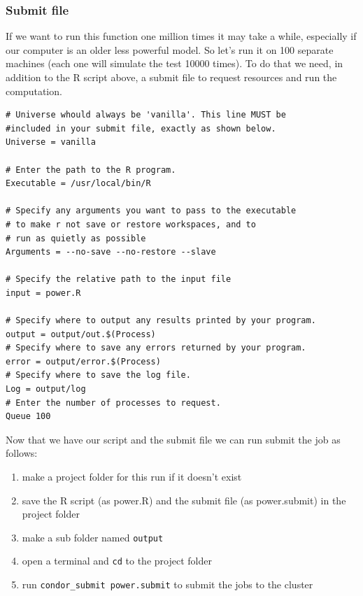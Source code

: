 \documentclass[11pt]{article}
\begin{document}
\subsubsection{Submit file}
\label{sec-7-3-2}
If we want to run this function one million times it may take a while, especially if our computer is an older less powerful model. So let's run it on 100 separate machines (each one will simulate the test 10000 times). To do that we need, in addition to the R script above, a submit file to request resources and run the computation. 
\begin{verbatim}
# Universe whould always be 'vanilla'. This line MUST be 
#included in your submit file, exactly as shown below.
Universe = vanilla

# Enter the path to the R program.
Executable = /usr/local/bin/R

# Specify any arguments you want to pass to the executable
# to make r not save or restore workspaces, and to 
# run as quietly as possible
Arguments = --no-save --no-restore --slave

# Specify the relative path to the input file
input = power.R

# Specify where to output any results printed by your program.
output = output/out.$(Process)
# Specify where to save any errors returned by your program.
error = output/error.$(Process)
# Specify where to save the log file.
Log = output/log
# Enter the number of processes to request.
Queue 100
\end{verbatim}

Now that we have our script and the submit file we can run submit the job as follows:
\begin{enumerate}
\item make a project folder for this run if it doesn't exist
\item save the R script (as power.R) and the submit file (as power.submit) in the project folder
\item make a sub folder named \texttt{output}
\item open a terminal and \texttt{cd} to the project folder
\item run \texttt{condor\_submit power.submit} to submit the jobs to the cluster
\end{enumerate}
\end{document}
